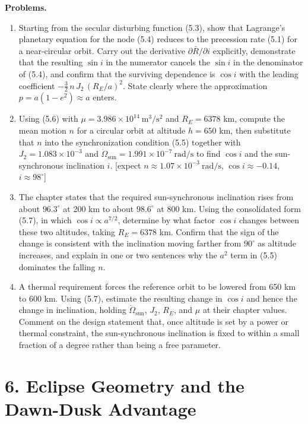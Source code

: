 \documentclass[
  11pt,
  openany,
  oneside]{book}
\begin{document}
\textbf{Problems.}

\begin{enumerate}
\def\labelenumi{\arabic{enumi}.}
\item
  Starting from the secular disturbing function (5.3), show that
  Lagrange's planetary equation for the node (5.4) reduces to the
  precession rate (5.1) for a near-circular orbit. Carry out the
  derivative \(\partial\bar R/\partial i\) explicitly, demonstrate that
  the resulting \(\sin i\) in the numerator cancels the \(\sin i\) in
  the denominator of (5.4), and confirm that the surviving dependence is
  \(\cos i\) with the leading coefficient
  \(-\tfrac{3}{2}\,n\,J_2\,(R_E/a)^2\). State clearly where the
  approximation \(p = a(1-e^2) \approx a\) enters.
\item
  Using (5.6) with \(\mu = 3.986\times10^{14}\ \mathrm{m^3/s^2}\) and
  \(R_E = 6378\) km, compute the mean motion \(n\) for a circular orbit
  at altitude \(h = 650\) km, then substitute that \(n\) into the
  synchronization condition (5.5) together with
  \(J_2 = 1.083\times10^{-3}\) and
  \(\dot\Omega_{\mathrm{sun}} = 1.991\times10^{-7}\ \mathrm{rad/s}\) to
  find \(\cos i\) and the sun-synchronous inclination \(i\). {[}expect
  \(n \approx 1.07\times10^{-3}\ \mathrm{rad/s}\),
  \(\cos i \approx -0.14\), \(i \approx 98^\circ\){]}
\item
  The chapter states that the required sun-synchronous inclination rises
  from about \(96.3^\circ\) at 200 km to about \(98.6^\circ\) at 800 km.
  Using the consolidated form (5.7), in which
  \(\cos i \propto a^{7/2}\), determine by what factor \(\cos i\)
  changes between these two altitudes, taking \(R_E = 6378\) km. Confirm
  that the sign of the change is consistent with the inclination moving
  farther from \(90^\circ\) as altitude increases, and explain in one or
  two sentences why the \(a^2\) term in (5.5) dominates the falling
  \(n\).
\item
  A thermal requirement forces the reference orbit to be lowered from
  650 km to 600 km. Using (5.7), estimate the resulting change in
  \(\cos i\) and hence the change in inclination, holding
  \(\dot\Omega_{\mathrm{sun}}\), \(J_2\), \(R_E\), and \(\mu\) at their
  chapter values. Comment on the design statement that, once altitude is
  set by a power or thermal constraint, the sun-synchronous inclination
  is fixed to within a small fraction of a degree rather than being a
  free parameter.
\end{enumerate}

\chapter{6. Eclipse Geometry and the Dawn-Dusk
Advantage}\label{eclipse-geometry-and-the-dawn-dusk-advantage}
\end{document}
